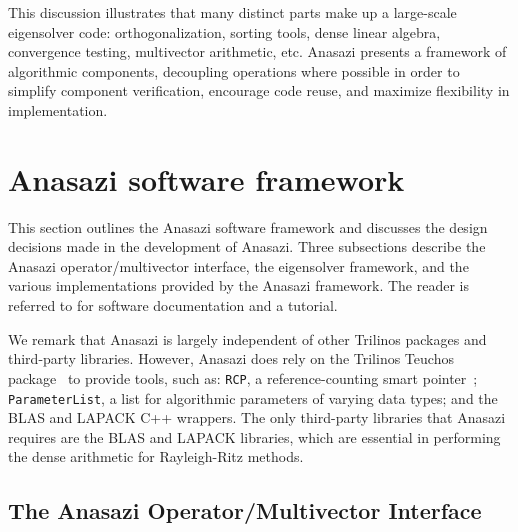 \documentclass[acmtoms]{acmtrans2m}
\newcounter{algorithm}
\newcommand{\aspace}[1]{\texttt{#1}}
\begin{document}
This discussion illustrates that many distinct parts make up a large-scale eigensolver
code: orthogonalization, sorting tools, dense linear algebra, convergence testing,
multivector arithmetic, etc. Anasazi presents a framework of algorithmic components,
decoupling operations where possible in order to simplify component verification,
encourage code reuse, and maximize flexibility in implementation.


\section{Anasazi software framework}
\label{sec:framework}

This section outlines the Anasazi software framework and discusses 
the design decisions made in the development of Anasazi. Three
subsections describe the Anasazi operator/multivector interface, the
eigensolver framework, and the various implementations provided by the
Anasazi framework. The reader is referred to
\cite{Trilinos:Anasazi,Trilinos-Tutorial} for software documentation
and a tutorial.

We remark that Anasazi is largely independent of other Trilinos packages and
third-party libraries. However, Anasazi does rely on the Trilinos Teuchos 
package~\cite{Trilinos:Teuchos} to provide tools, such as: \texttt{RCP},
a reference-counting smart pointer~\cite{Detlefs:1992:GCR,Teuchos-RCP};
\texttt{ParameterList}, a list for algorithmic parameters of
varying data types; and the BLAS \cite{Lawson:1979:BLA,Blackford:2002:USB} 
and LAPACK \cite{abbd:95} C++ wrappers.
The only third-party libraries that Anasazi requires are the BLAS and
LAPACK libraries, which are essential in performing the dense arithmetic
for Rayleigh-Ritz methods.


\subsection{The Anasazi Operator/Multivector Interface}
\label{sec:anasazi:opvec}
\end{document}
